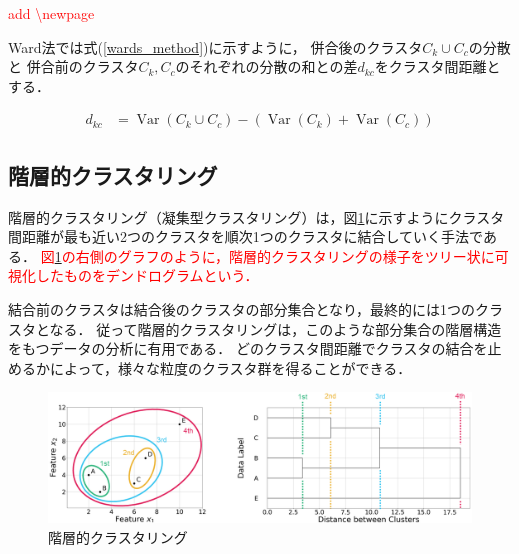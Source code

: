 \documentclass[12pt,a4j]{jreport}
\begin{document}
\textcolor{red}{add \textbackslash newpage}
\newpage

Ward法では式(\ref{wards_method})に示すように，
併合後のクラスタ$C_{k} \cup C_{c}$の分散と
併合前のクラスタ$C_{k}, C_{c}$のそれぞれの分散の和との差$d_{k c}$をクラスタ間距離とする．


\begin{align}
  d_{k c} &= \operatorname{Var} \left( C_{k} \cup C_{c} \right)
  -
  \left(
    \operatorname{Var}\left(C_{k}\right)
    +
    \operatorname{Var}\left(C_{c}\right)
  \right)
  \label{wards_method}
\end{align}



\subsection{階層的クラスタリング}
\label{subsection_hierarchical_clustering}
階層的クラスタリング（凝集型クラスタリング）は，図\ref{fig_clustering_example}に示すようにクラスタ間距離が最も近い2つのクラスタを順次1つのクラスタに結合していく手法である．
\textcolor{red}{
図\ref{fig_clustering_example}の右側のグラフのように，階層的クラスタリングの様子をツリー状に可視化したものをデンドログラムという．
}

結合前のクラスタは結合後のクラスタの部分集合となり，最終的には1つのクラスタとなる．
従って階層的クラスタリングは，このような部分集合の階層構造をもつデータの分析に有用である．
どのクラスタ間距離でクラスタの結合を止めるかによって，様々な粒度のクラスタ群を得ることができる．

\begin{figure}[H]
	\centering
	\includegraphics[keepaspectratio, width=120mm]{img/clustering_example.png}
	\caption{階層的クラスタリング}
	\label{fig_clustering_example}
\end{figure}
\end{document}
